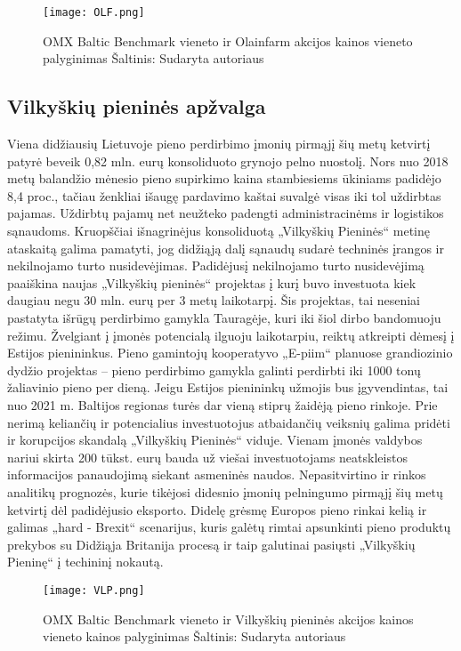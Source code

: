 \documentclass[titlepage, 11pt]{article}
\begin{document}
\begin{figure}[H]
\captionsetup{justification=centering}
\center
\texttt{[image: OLF.png]}
\caption{OMX Baltic Benchmark vieneto ir Olainfarm akcijos kainos vieneto palyginimas \newline
Šaltinis: Sudaryta autoriaus}
\end{figure}

\subsection{Vilkyškių pieninės apžvalga}
Viena didžiausių Lietuvoje pieno perdirbimo įmonių pirmąjį šių metų ketvirtį patyrė beveik 0,82 mln. eurų konsoliduoto grynojo pelno nuostolį. Nors nuo 2018 metų balandžio mėnesio pieno supirkimo kaina stambiesiems ūkiniams padidėjo 8,4 proc., tačiau ženkliai išaugę pardavimo kaštai suvalgė visas iki tol uždirbtas pajamas. Uždirbtų pajamų net neužteko padengti administracinėms ir logistikos sąnaudoms. Kruopščiai išnagrinėjus konsoliduotą „Vilkyškių Pieninės“ metinę ataskaitą galima pamatyti, jog didžiąją dalį sąnaudų sudarė techninės įrangos ir nekilnojamo turto nusidevėjimas. Padidėjusį nekilnojamo turto nusidevėjimą paaiškina naujas „Vilkyškių pieninės“ projektas į kurį buvo investuota kiek daugiau negu 30 mln. eurų per 3 metų laikotarpį. Šis projektas, tai neseniai pastatyta išrūgų perdirbimo gamykla Tauragėje, kuri iki šiol dirbo bandomuoju režimu. Žvelgiant į įmonės potencialą ilguoju laikotarpiu, reiktų atkreipti dėmesį į Estijos pienininkus. Pieno gamintojų kooperatyvo „E-piim“ planuose grandiozinio dydžio projektas – pieno perdirbimo gamykla galinti perdirbti iki 1000 tonų žaliavinio pieno per dieną. Jeigu Estijos pienininkų užmojis bus įgyvendintas, tai nuo 2021 m. Baltijos regionas turės dar vieną stiprų žaidėją pieno rinkoje. Prie nerimą keliančių ir potencialius investuotojus atbaidančių veiksnių galima pridėti ir korupcijos skandalą „Vilkyškių Pieninės“ viduje. Vienam įmonės valdybos nariui skirta 200 tūkst. eurų bauda už viešai investuotojams neatskleistos informacijos panaudojimą siekant asmeninės naudos. Nepasitvirtino ir rinkos analitikų prognozės, kurie tikėjosi didesnio įmonių pelningumo pirmąjį šių metų ketvirtį dėl padidėjusio eksporto. Didelę grėsmę Europos pieno rinkai kelią ir galimas „hard - Brexit“ scenarijus, kuris galėtų rimtai apsunkinti pieno produktų prekybos su Didžiąja Britanija procesą ir taip galutinai pasiųsti „Vilkyškių Pieninę“ į techininį nokautą.

\begin{figure}[H]
\captionsetup{justification=centering}
\center
\texttt{[image: VLP.png]}
\caption{OMX Baltic Benchmark vieneto ir Vilkyškių pieninės akcijos kainos vieneto kainos palyginimas \newline
Šaltinis: Sudaryta autoriaus}
\end{figure}
\end{document}
